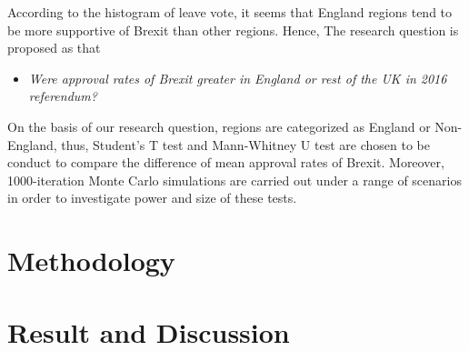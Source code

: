 \documentclass[]{article}
\providecommand{\tightlist}{%
  \setlength{\itemsep}{0pt}\setlength{\parskip}{0pt}}
\begin{document}
According to the histogram of leave vote, it seems that England regions
tend to be more supportive of Brexit than other regions. Hence, The
research question is proposed as that

\begin{itemize}
\tightlist
\item
  \emph{Were approval rates of Brexit greater in England or rest of the
  UK in 2016 referendum?}
\end{itemize}

On the basis of our research question, regions are categorized as
England or Non-England, thus, Student's T test and Mann-Whitney U test
are chosen to be conduct to compare the difference of mean approval
rates of Brexit. Moreover, 1000-iteration Monte Carlo simulations are
carried out under a range of scenarios in order to investigate power and
size of these tests.

\hypertarget{methodology}{%
\section{Methodology}\label{methodology}}

\hypertarget{result-and-discussion}{%
\section{Result and Discussion}\label{result-and-discussion}}
\end{document}
